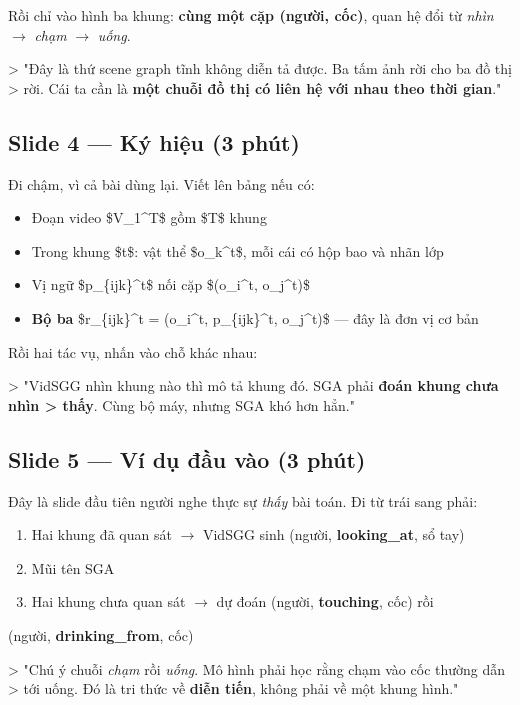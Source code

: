 \documentclass[11pt,a4paper]{article}
\begin{document}
Rồi chỉ vào hình ba khung: \textbf{cùng một cặp (người, cốc)}, quan hệ đổi từ \emph{nhìn} $\rightarrow$ \emph{chạm} $\rightarrow$ \emph{uống}.

> "Đây là thứ scene graph tĩnh không diễn tả được. Ba tấm ảnh rời cho ba đồ thị > rời. Cái ta cần là \textbf{một chuỗi đồ thị có liên hệ với nhau theo thời gian}."

\subsection{Slide 4 --- Ký hiệu (3 phút)}
Đi chậm, vì cả bài dùng lại. Viết lên bảng nếu có:

\begin{itemize}\itemsep2pt
\item Đoạn video \$V\_1\textasciicircum{}T\$ gồm \$T\$ khung
\item Trong khung \$t\$: vật thể \$o\_k\textasciicircum{}t\$, mỗi cái có hộp bao và nhãn lớp
\item Vị ngữ \$p\_\{ijk\}\textasciicircum{}t\$ nối cặp \$(o\_i\textasciicircum{}t, o\_j\textasciicircum{}t)\$
\item \textbf{Bộ ba} \$r\_\{ijk\}\textasciicircum{}t = (o\_i\textasciicircum{}t, p\_\{ijk\}\textasciicircum{}t, o\_j\textasciicircum{}t)\$ --- đây là đơn vị cơ bản
\end{itemize}
Rồi hai tác vụ, nhấn vào chỗ khác nhau:

> "VidSGG nhìn khung nào thì mô tả khung đó. SGA phải \textbf{đoán khung chưa nhìn > thấy}. Cùng bộ máy, nhưng SGA khó hơn hẳn."

\subsection{Slide 5 --- Ví dụ đầu vào (3 phút)}
Đây là slide đầu tiên người nghe thực sự \emph{thấy} bài toán. Đi từ trái sang phải:

\begin{enumerate}\itemsep2pt
\item Hai khung đã quan sát $\rightarrow$ VidSGG sinh (người, \textbf{looking\_at}, sổ tay)
\item Mũi tên SGA
\item Hai khung chưa quan sát $\rightarrow$ dự đoán (người, \textbf{touching}, cốc) rồi
\end{enumerate}
(người, \textbf{drinking\_from}, cốc)

> "Chú ý chuỗi \emph{chạm} rồi \emph{uống}. Mô hình phải học rằng chạm vào cốc thường dẫn > tới uống. Đó là tri thức về \textbf{diễn tiến}, không phải về một khung hình."
\end{document}
